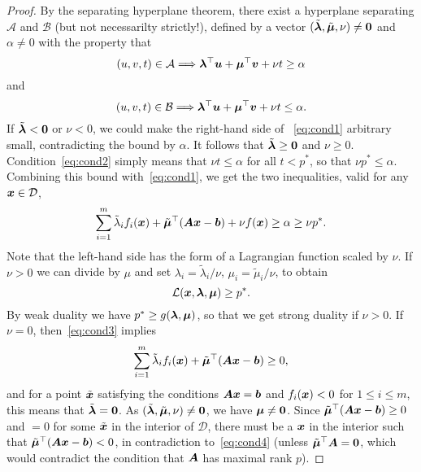\begin{proof}
By the separating hyperplane theorem, there exist a hyperplane separating $\mathcal{A}$ and $\mathcal{B}$ (but not necessarilty strictly!), defined by a vector $(\tilde{\bm{\lambda}},\tilde{\bm{\mu}},\nu)\neq \bm{0}$ and $\alpha\neq 0$ with the property that
\begin{equation}\label{eq:cond1}
 (u,v,t)\in \mathcal{A} \Longrightarrow \bm{\lambda}^{\top}\bm{u}+\bm{\mu}^{\top}\bm{v}+\nu t\geq \alpha
 \end{equation}
 and
 \begin{equation}\label{eq:cond2}
 (u,v,t)\in \mathcal{B} \Longrightarrow \bm{\lambda}^{\top}\bm{u}+\bm{\mu}^{\top}\bm{v}+\nu t\leq \alpha.
\end{equation}
If $\tilde{\bm{\lambda}}<\bm{0}$ or $\nu<0$, we could make the right-hand side of ~\eqref{eq:cond1} arbitrary small, contradicting the bound by $\alpha$. It follows that $\tilde{\bm{\lambda}}\geq \bm{0}$ and $\nu\geq 0$. Condition~\eqref{eq:cond2} simply means that $\nu t\leq \alpha$ for all $t<p^*$, so that $\nu p^*\leq \alpha$. Combining this bound with~\eqref{eq:cond1}, we get the two inequalities, valid for any $\bm{x}\in \mathcal{D}$,
\begin{equation}\label{eq:cond3}
 \sum_{i=1}^m \tilde{\lambda}_i f_i(\bm{x}) + \tilde{\bm{\mu}}^{\top}(\bm{A}\bm{x}-\bm{b})+\nu f(\bm{x}) \geq \alpha \geq \nu p^*.
\end{equation}
Note that the left-hand side has the form of a Lagrangian function scaled by $\nu$.
If $\nu>0$ we can divide by $\mu$ and set $\lambda_i=\tilde{\lambda}_i/\nu$, $\mu_i=\tilde{\mu}_i/\nu$, to obtain
\begin{equation*}
 \mathcal{L}(\bm{x},\bm{\lambda},\bm{\mu}) \geq p^*.
\end{equation*}
By weak duality we have $p^*\geq g(\bm{\lambda},\bm{\mu})$, so that we get strong duality if $\nu>0$. If $\nu=0$, then~\eqref{eq:cond3} implies
\begin{equation}\label{eq:cond4}
 \sum_{i=1}^m \tilde{\lambda}_i f_i(\bm{x}) + \tilde{\bm{\mu}}^{\top}(\bm{A}\bm{x}-\bm{b})\geq 0,
\end{equation}
and for a point $\tilde{\bm{x}}$ satisfying the conditions $\bm{A}\bm{x}=\bm{b}$ and $f_i(\bm{x})<0$ for $1\leq i\leq m$, this means that $\tilde{\bm{\lambda}}=\bm{0}$. As $(\tilde{\bm{\lambda}},\tilde{\bm{\mu}},\nu)\neq \bm{0}$, we have $\bm{\mu}\neq \bm{0}$. Since $\tilde{\bm{\mu}}^{\top}(\bm{A}\bm{x}-\bm{b})\geq 0$ and $=0$ for some $\tilde{\bm{x}}$ in the interior of $\mathcal{D}$, there must be a $\bm{x}$ in the interior such that $\tilde{\bm{\mu}}^{\top}(\bm{A}\bm{x}-\bm{b})<0$, in contradiction to~\eqref{eq:cond4} (unless $\tilde{\bm{\mu}}^{\top}\bm{A}=\bm{0}$, which would contradict the condition that $\bm{A}$ has maximal rank $p$).
\end{proof}

